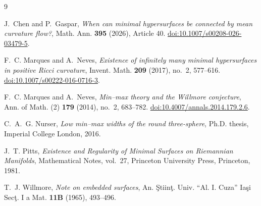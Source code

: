 \documentclass[11pt]{article}
\theoremstyle{remark}
\begin{document}
\begin{thebibliography}{9}

J.~Chen and P.~Gaspar,
\emph{When can minimal hypersurfaces be connected by mean curvature flow?},
Math. Ann. \textbf{395} (2026), Article 40.
\href{https://doi.org/10.1007/s00208-026-03479-5}
{doi:10.1007/s00208-026-03479-5}.

F.~C. Marques and A.~Neves,
\emph{Existence of infinitely many minimal hypersurfaces in positive
Ricci curvature},
Invent. Math. \textbf{209} (2017), no.~2, 577--616.
\href{https://doi.org/10.1007/s00222-016-0716-3}
{doi:10.1007/s00222-016-0716-3}.

F.~C. Marques and A.~Neves,
\emph{Min--max theory and the Willmore conjecture},
Ann. of Math. (2) \textbf{179} (2014), no.~2, 683--782.
\href{https://doi.org/10.4007/annals.2014.179.2.6}
{doi:10.4007/annals.2014.179.2.6}.

C.~A.~G. Nurser,
\emph{Low min--max widths of the round three-sphere},
Ph.D. thesis, Imperial College London, 2016.

J.~T. Pitts,
\emph{Existence and Regularity of Minimal Surfaces on Riemannian Manifolds},
Mathematical Notes, vol.~27, Princeton University Press, Princeton, 1981.

T.~J. Willmore,
\emph{Note on embedded surfaces},
An. \c{S}tiin\c{t}. Univ. ``Al. I. Cuza'' Ia\c{s}i Sec\c{t}. I a Mat.
\textbf{11B} (1965), 493--496.

\end{thebibliography}
\end{document}
